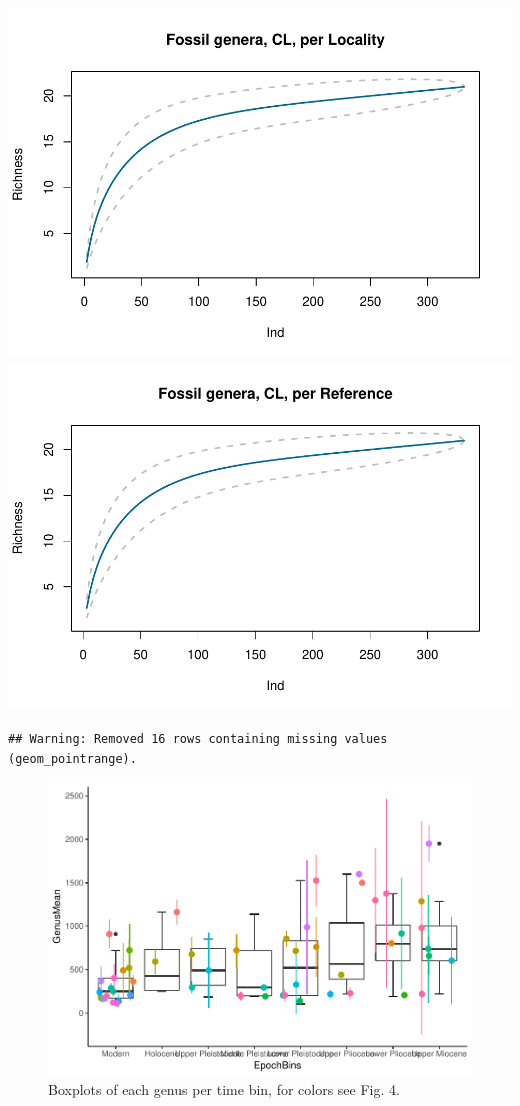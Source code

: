 \documentclass[]{article}
\begin{document}
\includegraphics{MA_JJ_files/figure-latex/Species Accumulation Curve with Genera-1.pdf}
\includegraphics{MA_JJ_files/figure-latex/Species Accumulation Curve with Genera-2.pdf}

\begin{verbatim}
## Warning: Removed 16 rows containing missing values (geom_pointrange).
\end{verbatim}

\begin{figure}[htbp]
\centering
\includegraphics{MA_JJ_files/figure-latex/Boxplots of each genus per time bin-1.pdf}
\caption{Boxplots of each genus per time bin, for colors see Fig. 4.}
\end{figure}
\end{document}
